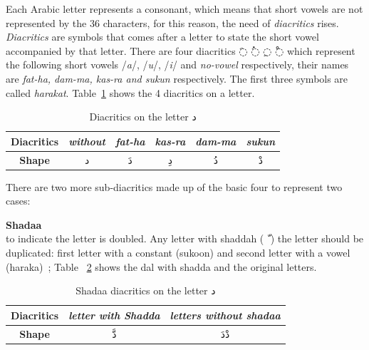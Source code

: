 Each Arabic letter represents a consonant, which means that short vowels are not
represented by the 36 characters, for this reason, the need of \textit{diacritics}
rises. \textit{Diacritics} are symbols that comes after a letter to state the
short vowel accompanied by that letter. There are four diacritics \textarabic{◌َ} \textarabic{◌ُ}
\textarabic{◌ِ} \textarabic{◌ْ} which represent the following short vowels
/\textit{a}/, /\textit{u}/, /\textit{i}/ and \textit{no-vowel} respectively,
their names are \textit{fat-ha, dam-ma, kas-ra and sukun} respectively.  The first
three symbols are called \textit{harakat}. Table~\ref{tables:diacritics_dal}
shows the 4 diacritics on a letter.



\begin{table}[H]
	\centering
	\begin{tabular}{c c c c c c}
		\toprule
		\textbf{\small{Diacritics}}     & \small{\textit{without}} & \small{\textit{fat-ha}} &
		\small{\textit{kas-ra}} & \small{\textit{dam-ma}} & \small{\textit{sukun}}\\
		\midrule
		\textbf{\small{Shape}}   & \textarabic{د} & \textarabic{دَ} & \textarabic{دِ} &
		\textarabic{دُ} & \textarabic{دْ}\\
		\bottomrule
	\end{tabular}
	\caption{Diacritics on the letter  \textarabic{ د }}\label{tables:diacritics_dal}
\end{table}



There are two more sub-diacritics made up of the basic four to represent two
cases:
\begin{definition}\label{def:shadaa_definition}
  \textbf{Shadaa}  \hfill \\
to indicate the letter is doubled. Any letter with
shaddah (\textarabic{ ّ } ) the letter should be duplicated: first letter with a
constant (sukoon) and second letter with a vowel (haraka)~\cite{Alnagdawi2013}; Table ~\ref{tables:shadda_dal}
shows the dal with shadda and the original letters.

\begin{table}[H]
	\centering
	\begin{tabular}{c c c}
		\toprule
		\textbf{\small{Diacritics}} & \small{\textit{letter with Shadda }} & \small{\textit{letters without shadaa  }} \\
		\midrule
		\textbf{\small{Shape}}  & \textarabic{دَّ} &  \textarabic{دْدَ}\\
		\bottomrule
	\end{tabular}
	\caption{Shadaa diacritics on the letter  \textarabic{ د }}\label{tables:shadda_dal}
\end{table}

\end{definition}

